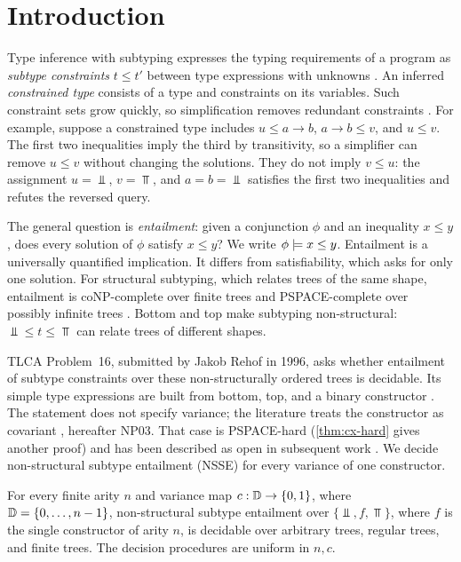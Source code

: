 \section{Introduction}
\label{sec:intro}

Type inference with subtyping expresses the typing requirements of a program
as \emph{subtype constraints} $t\le t'$ between type expressions with unknowns
\citep{Mitchell91,FuhMishra90,AikenWimmers93,EifrigSmithTrifonov95,Pottier98}.
An inferred \emph{constrained type} consists of a type and constraints on its
variables. Such constraint sets grow quickly, so simplification removes
redundant constraints \citep{Pottier96,Pottier01,TrifonovSmith96,Rehof97}.
For example, suppose a constrained type includes
$u\le a\to b$, $a\to b\le v$, and $u\le v$.
The first two inequalities imply the third by transitivity, so a simplifier
can remove $u\le v$ without changing the solutions. They do not imply
$v\le u$: the assignment $u=\Bot$, $v=\Top$, and $a=b=\Bot$ satisfies
the first two inequalities and refutes the reversed query.

The general question is \emph{entailment}: given a conjunction $\phi$ and
an inequality $x\le y$, does every solution of $\phi$ satisfy $x\le y$?
We write $\phi\models x\le y$. Entailment is a universally quantified
implication. It differs from satisfiability, which asks for only one solution.
For structural subtyping, which relates trees of the same shape, entailment
is coNP-complete over finite trees and PSPACE-complete over possibly infinite
trees \citep{HengleinRehof97,HengleinRehof98}. Bottom and top make subtyping
non-structural: $\Bot\le t\le\Top$ can relate trees of different shapes.

TLCA Problem~16, submitted by Jakob Rehof in 1996, asks whether entailment
of subtype constraints over these non-structurally ordered trees is
decidable. Its simple type expressions are built from bottom, top, and a
binary constructor \citep{Rehof96TLCA}. The statement does not specify
variance; the literature treats the constructor as covariant
\citep{NiehrenPriesnitz03}, hereafter NP03. That case is PSPACE-hard
\citep{HengleinRehof98} (\cref{thm:cx-hard} gives another proof) and has
been described as open in subsequent work
\citep{NiehrenPriesnitz03,DudenhefnerMartensRehof17,JiangCuiOliveira25}.
We decide non-structural subtype entailment (NSSE) for every variance of
one constructor.

\begin{theorem}\label{thm:main}
For every finite arity $n$ and variance map $c:\mathbb{D}\to\{0,1\}$, where
$\mathbb{D}=\{0,\ldots,n-1\}$,
non-structural subtype entailment over $\{\Bot,f,\Top\}$, where $f$ is the
single constructor of arity $n$, is decidable over arbitrary trees, regular
trees, and finite trees. The decision procedures are uniform in $n,c$.
\end{theorem}


